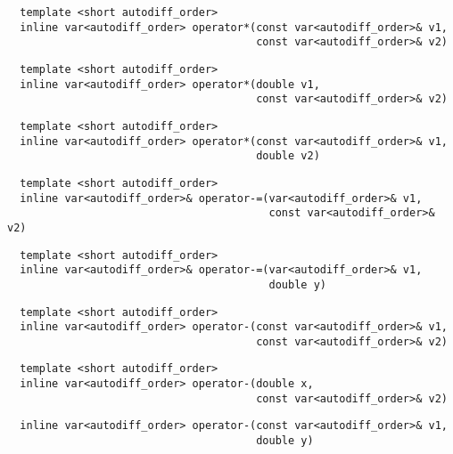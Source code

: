 \begin{tcolorbox}[colback=white,colframe=gray90, coltitle=black,boxrule=3pt,
fonttitle=\bfseries,title=Operator Multiplication]

\begin{verbatim}
  template <short autodiff_order>
  inline var<autodiff_order> operator*(const var<autodiff_order>& v1,
                                       const var<autodiff_order>& v2)
\end{verbatim}

\begin{verbatim}
  template <short autodiff_order>
  inline var<autodiff_order> operator*(double v1,
                                       const var<autodiff_order>& v2)
\end{verbatim}

\begin{verbatim}
  template <short autodiff_order>
  inline var<autodiff_order> operator*(const var<autodiff_order>& v1,
                                       double v2)
\end{verbatim}

\end{tcolorbox}

\begin{tcolorbox}[colback=white,colframe=gray90, coltitle=black,boxrule=3pt,
fonttitle=\bfseries,title=Operator Subtraction Assignment]

\begin{verbatim}
  template <short autodiff_order>
  inline var<autodiff_order>& operator-=(var<autodiff_order>& v1,
                                         const var<autodiff_order>& v2)
\end{verbatim}

\begin{verbatim}
  template <short autodiff_order>
  inline var<autodiff_order>& operator-=(var<autodiff_order>& v1,
                                         double y)
\end{verbatim}

\end{tcolorbox}

\begin{tcolorbox}[colback=white,colframe=gray90, coltitle=black,boxrule=3pt,
fonttitle=\bfseries,title=Operator Subtraction]

\begin{verbatim}
  template <short autodiff_order>
  inline var<autodiff_order> operator-(const var<autodiff_order>& v1,
                                       const var<autodiff_order>& v2)
\end{verbatim}

\begin{verbatim}
  template <short autodiff_order>
  inline var<autodiff_order> operator-(double x,
                                       const var<autodiff_order>& v2)
\end{verbatim}

\begin{verbatim}
  inline var<autodiff_order> operator-(const var<autodiff_order>& v1,
                                       double y)
\end{verbatim}

\end{tcolorbox}

